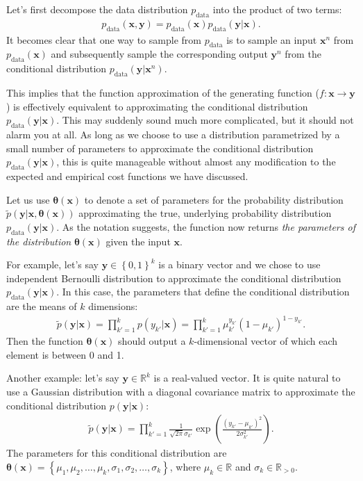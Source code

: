 \documentclass{report}
\newcommand{\vect}[1]{\mathbf{#1}}
\newcommand{\vects}[1]{\boldsymbol{#1}}
\newcommand{\vx}[0]{\vect{x}}
\newcommand{\vy}[0]{\vect{y}}
\newcommand{\TT}[0]{\vects{\theta}}
\newcommand{\RR}[0]{\mathbb{R}}
\newcommand{\data}{\text{data}}
\begin{document}
Let's first decompose the data distribution $p_{\data}$ into the product
of two terms:
\begin{align*}
    p_{\data}(\vx, \vy) = p_{\data}(\vx) p_{\data}(\vy |\vx).
\end{align*}
It becomes clear that one way to sample from $p_{\data}$ is to sample an input
$\vx^n$ from $p_{\data}(\vx)$ and subsequently sample the corresponding output
$\vy^n$ from the conditional distribution $p_{\data}(\vy | \vx^n)$. 

This implies that the function approximation of the generating function ($f:
\vx \to \vy$) is effectively equivalent to approximating the conditional
distribution $p_{\data}(\vy | \vx)$. This may suddenly sound much more
complicated, but it should not alarm you at all.  As long as we choose to use a
distribution parametrized by a small number of parameters to approximate the
conditional distribution $p_{\data}(\vy | \vx)$, this is quite manageable
without almost any modification to the expected and empirical cost functions we
have discussed. 

Let us use $\TT(\vx)$ to denote a set of parameters for the probability
distribution $\tilde{p}(\vy|\vx, \TT(\vx))$ approximating the true, underlying
probability distribution $p_{\data}(\vy|\vx)$. As the notation suggests, the
function now returns {\em the parameters of the distribution} $\TT(\vx)$ given
the input $\vx$. 

For example, let's say $\vy \in \left\{ 0, 1\right\}^k$ is a binary vector and
we chose to use independent Bernoulli distribution to approximate the
conditional distribution $p_{\data}(\vy | \vx)$. In this case, the parameters
that define the conditional distribution are the means of $k$ dimensions:
\begin{align}
    \label{eq:bernoulli}
    \tilde{p}(\vy | \vx) = \prod_{k'=1}^k p(y_{k'}|\vx) = 
    \prod_{k'=1}^k \mu_{k'}^{y_{k'}} (1-\mu_{k'})^{1-y_{k'}}.
\end{align}
Then the function $\TT(\vx)$ should output a $k$-dimensional vector of which
each element is between 0 and 1.

Another example: let's say $\vy \in \RR^k$ is a real-valued vector. It is quite
natural to use a Gaussian distribution with a diagonal covariance matrix to
approximate the conditional distribution $p(\vy | \vx)$:
\begin{align}
    \label{eq:gaussian}
    \tilde{p}(\vy | \vx) = \prod_{k'=1}^k \frac{1}{\sqrt{2\pi}\sigma_{k'}} 
\exp\left( \frac{(y_{k'} - \mu_{k'})^2}{2\sigma_{k'}^2} \right).
\end{align}
The parameters for this conditional distribution are $\TT(\vx) = \left\{ 
    \mu_1, \mu_2, \ldots, \mu_k, \sigma_1, \sigma_2, \ldots, \sigma_k
\right\}$, where $\mu_k \in \RR$ and $\sigma_k \in \RR_{>0}$.
\end{document}
